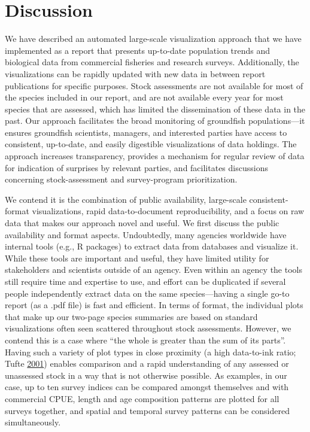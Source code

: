 \documentclass[12pt,]{article}
\begin{document}
\hypertarget{discussion}{%
\section*{Discussion}\label{discussion}}

We have described an automated large-scale visualization approach that we have implemented as a report that presents up-to-date population trends and biological data from commercial fisheries and research surveys. Additionally, the visualizations can be rapidly updated with new data in between report publications for specific purposes. Stock assessments are not available for most of the species included in our report, and are not available every year for most species that are assessed, which has limited the dissemination of these data in the past. Our approach facilitates the broad monitoring of groundfish populations---it ensures groundfish scientists, managers, and interested parties have access to consistent, up-to-date, and easily digestible visualizations of data holdings. The approach increases transparency, provides a mechanism for regular review of data for indication of surprises by relevant parties, and facilitates discussions concerning stock-assessment and survey-program prioritization.

We contend it is the combination of public availability, large-scale consistent-format visualizations, rapid data-to-document reproducibility, and a focus on raw data that makes our approach novel and useful.
We first discuss the public availability and format aspects.
Undoubtedly, many agencies worldwide have internal tools (e.g., R packages) to extract data from databases and visualize it. While these tools are important and useful, they have limited utility for stakeholders and scientists outside of an agency. Even within an agency
the tools still require time and expertise to use, and effort can be duplicated
if several people independently extract data on the same species---having a
single go-to report (as a .pdf file) is fast and efficient.
In terms of format, the individual plots that make up our two-page species summaries are based on standard visualizations often seen scattered throughout stock assessments.
However, we contend this is a case where ``the whole is greater than the sum of its parts''.
Having such a variety of plot types in close proximity (a high data-to-ink ratio; Tufte \protect\hyperlink{ref-tufte2001}{2001}) enables comparison and a rapid understanding of any assessed or unassessed stock in a way that is not otherwise possible.
As examples, in our case, up to ten survey indices can be compared amongst themselves and with commercial CPUE, length and age composition patterns are plotted for all surveys together, and spatial and temporal survey patterns can be considered simultaneously.
\end{document}
